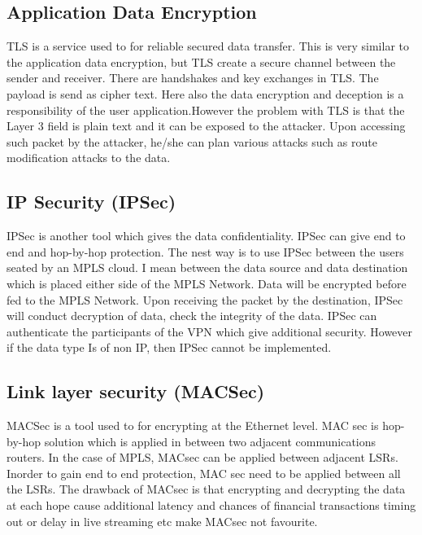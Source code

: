  
 \subsection{Application Data Encryption}
 
 TLS\cite{rfc8446} is a service used to for reliable secured data transfer. This is very similar to the application data encryption, but TLS create a secure channel between the sender and receiver. There are handshakes and key exchanges in TLS. The payload is send as cipher text. Here also the data encryption and deception is a responsibility of the user application.However the problem with TLS is that the Layer 3 field is plain text and it can be exposed to the attacker. Upon accessing such packet by the attacker, he/she can plan various attacks such as route modification attacks to the data. 
 
\subsection{IP Security (IPSec)}

IPSec\cite{shirazi_asim_irfan_ikram_2010} is another tool which gives the data confidentiality. IPSec can give end to end and hop-by-hop protection. The nest way is to use IPSec between the users seated by an MPLS cloud. I mean between the data source and data destination which is placed either side of the MPLS Network. Data will be encrypted before fed to the MPLS Network. Upon receiving the packet by the destination, IPSec will conduct decryption of data, check the integrity of the data. IPSec can authenticate the participants of the VPN which give additional security. However if the data type Is of non IP, then IPSec cannot be implemented. 

\subsection{Link layer security (MACSec)}

MACSec\cite{jeong_park_park_seo_han_jung_2016} is a tool used to for encrypting at the Ethernet level. MAC sec is hop-by-hop solution which is applied in between two adjacent communications routers. In the case of MPLS, MACsec can be applied between adjacent LSRs. Inorder to gain end to end protection, MAC sec need to be applied between all the LSRs. The drawback of MACsec is that encrypting and decrypting the data at each hope cause additional latency and chances of financial transactions timing out or delay in live streaming etc make MACsec not favourite. \\

